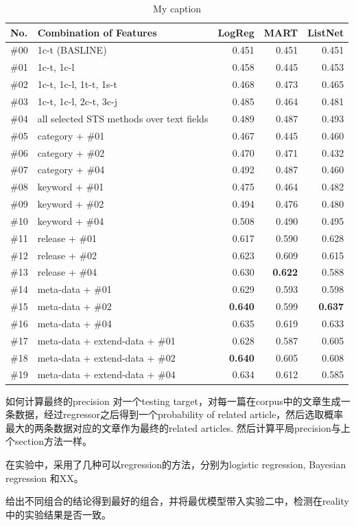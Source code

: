 \begin{table}[!hbt]
\centering
\begin{tabularx}{0.9\textwidth}{lXrrr}
\textbf{No.} & \textbf{Combination of Features} & \textbf{LogReg} & \textbf{MART} & \textbf{ListNet} \\ \hline
\#00 & 1c-t (BASLINE) & 0.451 & 0.451 & 0.451 \\ \hline
\#01 & 1c-t, 1c-l & 0.458 & 0.445 & 0.453 \\
\#02 & 1c-t, 1c-l, 1t-t, 1s-t & 0.468 & 0.473 & 0.465 \\
\#03 & 1c-t, 1c-l, 2c-t, 3c-j & 0.485 & 0.464 & 0.481 \\
\#04 & all selected STS methods over text fields & 0.489 & 0.487 & 0.493 \\
\#05 & category + \#01 & 0.467 & 0.445 & 0.460 \\
\#06 & category + \#02 & 0.470 & 0.471 & 0.432 \\
\#07 & category + \#04 & 0.492 & 0.487 & 0.460 \\
\#08 & keyword + \#01 & 0.475 & 0.464 & 0.482 \\
\#09 & keyword + \#02 & 0.494 & 0.476 & 0.480 \\
\#10 & keyword + \#04 & 0.508 & 0.490 & 0.495 \\
\#11 & release + \#01 & 0.617 & 0.590 & 0.628 \\
\#12 & release + \#02 & 0.623 & 0.609 & 0.615 \\
\#13 & release + \#04 & 0.630 & \textbf{0.622} & 0.588 \\
\#14 & meta-data + \#01 & 0.629 & 0.593 & 0.598 \\
\#15 & meta-data + \#02 & \textbf{0.640} & 0.599 & \textbf{0.637} \\
\#16 & meta-data + \#04 & 0.635 & 0.619 & 0.633 \\
\#17 & meta-data + extend-data + \#01 & 0.628 & 0.587 & 0.605 \\
\#18 & meta-data + extend-data + \#02 & \textbf{0.640} & 0.605 & 0.608 \\
\#19 & meta-data + extend-data + \#04 & 0.634 & 0.612 & 0.585 \\ \hline
\end{tabularx}
\caption{My caption}
\label{my-label}
\end{table}

如何计算最终的precision
对一个testing target，对每一篇在corpus中的文章生成一条数据，经过regressor之后得到一个probability of related article，然后选取概率最大的两条数据对应的文章作为最终的related articles. 然后计算平局precision与上个section方法一样。

在实验中，采用了几种可以regression的方法，分别为logistic regression, Bayesian regression 和XX。 

给出不同组合的结论得到最好的组合，并将最优模型带入实验二中，检测在reality中的实验结果是否一致。 
